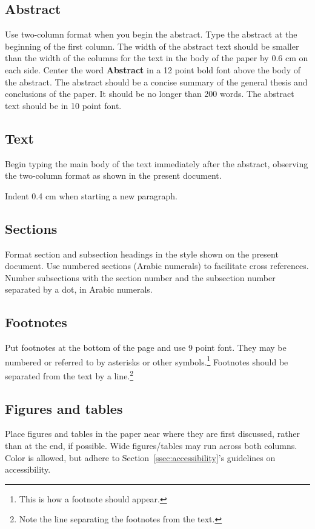 \documentclass[11pt,a4paper]{article}
\begin{document}
\subsection{Abstract}
Use two-column format when you begin the abstract.
Type the abstract at the beginning of the first column.
The width of the abstract text should be smaller than the
width of the columns for the text in the body of the paper by 0.6 cm on each side.
Center the word \textbf{Abstract} in a 12 point bold font above the body of the abstract.
The abstract should be a concise summary of the general thesis and conclusions of the paper.
It should be no longer than 200 words.
The abstract text should be in 10 point font.

\subsection{Text}
Begin typing the main body of the text immediately after the abstract, observing the two-column format as shown in the present document.

Indent 0.4 cm when starting a new paragraph.

\subsection{Sections}

Format section and subsection headings in the style shown on the present document.
Use numbered sections (Arabic numerals) to facilitate cross references.
Number subsections with the section number and the subsection number separated by a dot, in Arabic numerals.

\subsection{Footnotes}
Put footnotes at the bottom of the page and use 9 point font.
They may be numbered or referred to by asterisks or other symbols.\footnote{This is how a footnote should appear.}
Footnotes should be separated from the text by a line.\footnote{Note the line separating the footnotes from the text.}

\subsection{Figures and tables}

Place figures and tables in the paper near where they are first discussed, rather than at the end, if possible.
Wide figures/tables may run across both columns.
Color is allowed, but adhere to Section~\ref{ssec:accessibility}'s guidelines on accessibility.
\end{document}
